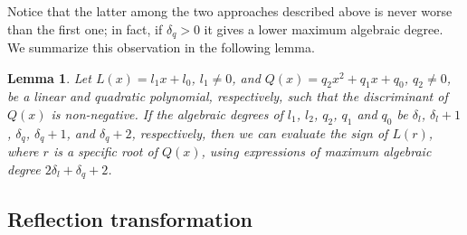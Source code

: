 \documentclass[letterpaper,11pt]{article}
\newtheorem{lemma}[theorem]{Lemma}
\begin{document}
Notice that the latter among the two approaches described above is never
worse than the first one; in fact, if $\delta_q>0$ it gives a lower
maximum algebraic degree. We summarize this observation in the
following lemma.

\begin{lemma}\label{lemma:lqsolve}
  Let $L(x)=l_1x+l_0$, $l_1\ne{}0$, and $Q(x)=q_2x^2+q_1x+q_0$,
  $q_2\ne{}0$, be a linear and quadratic polynomial, respectively,
  such that the discriminant of $Q(x)$ is non-negative. If the
  algebraic degrees of $l_1$, $l_2$, $q_2$, $q_1$ and $q_0$ be
  $\delta_l$, $\delta_l+1$, $\delta_q$, $\delta_q+1$, and
  $\delta_q+2$, respectively, then we can evaluate the sign of
  $L(r)$, where $r$ is a specific root of $Q(x)$, using
  expressions of maximum algebraic degree $2\delta_l+\delta_q+2$.
\end{lemma}

\begin{comment}
\item Resultants \\
Define $ L'(x) = L(x)-y $, we can evaluate $ L(x^\star) $ by evaluating 
$ Resultant(L'(x),P(x),x) $. We get that $ y_1,y_2 \in \{ L(x_1), L(x_2)\} $ 
are the roots of $ R(y) = R_2y^2+R_1y+R_0 $, where
\begin{align*}
  R_2 &= q_2 \\
  R_1 &= l_1 q_1-2q_2 l_0\\
  R_0 &= l_1^2 q_0-l_1q_1 l_0+q_2l_0^2
\end{align*}
According to Vieta's formulas, we get that
$sign(y_1y_2)=sign(R_0)sign(R_2)$,
and $ sign(y_1+y_2) = -sign(R_1)sign(R_2) $. Assume $ y_1 \leq y_2 $, 
the signs of $ y_1y_2 $ and $ y_1+y_2 $ are sufficient to evaluate the 
sign of $ y_i $. 

To distinguish whether $y_1=L(x_1)$ and $y_2=L(x_2)$ or the opposite, 
we evaluate
\begin{equation*}
  L(x_2)-L(x_1) = l_1 \dfrac{\sqrt{\Delta_Q}}{q_2}
\end{equation*}
hence $ sign(L(x_2)-L(x_1)) = sign(l_1) sign(q_2) $; If $ L(x_2)> L(x_1) $ we 
get $ y_i = L(x_i) $, whereas if $ L(x_2)<L(x_1) $ we get $ y_i = L(x_{3-i}) $, 
for $ i =1,2 $.

This method involves examining quantities of maximum 
algebraic degree $ 2m+n+2 $.
\end{enumerate}
\end{comment}


\subsection{Reflection transformation}
\label{sec:reflection}
\end{document}
